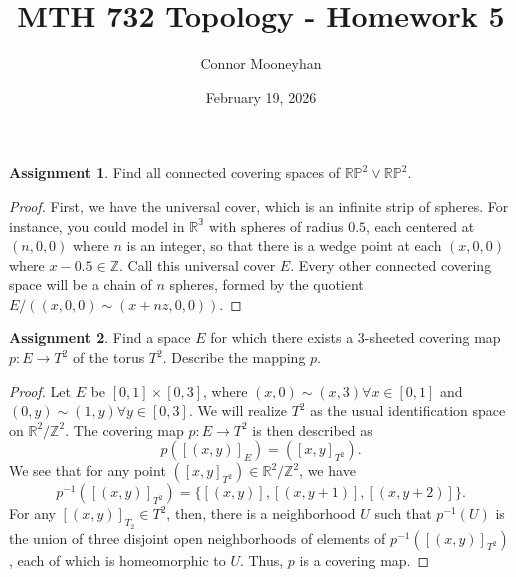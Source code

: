 \documentclass[12pt]{article}
\title{MTH 732 Topology - Homework 5}
\author{Connor Mooneyhan}
\date{February 19, 2026}
\theoremstyle{definition}
\newtheorem{ex}{Assignment}
\begin{document}
\maketitle

\begin{ex}
	Find all connected covering spaces of $\mathbb{RP}^2 \vee \mathbb{RP}^2$.
\end{ex}
\begin{proof}
	First, we have the universal cover, which is an infinite strip of spheres.
  For instance, you could model in $\mathbb{R^3}$ with spheres of radius $0.5$, each centered at $(n, 0, 0)$ where $n$ is an integer, so that there is a wedge point at each $(x, 0, 0)$ where $x - 0.5 \in \mathbb{Z}$.
  Call this universal cover $E$.
  Every other connected covering space will be a chain of $n$ spheres, formed by the quotient $E/((x, 0, 0) \sim (x + nz, 0, 0))$.
\end{proof}

\begin{ex}
	Find a space $E$ for which there exists a 3-sheeted covering map $p: E \to T^2$ of the torus $T^2$.
	Describe the mapping $p$.
\end{ex}
\begin{proof}
	Let $E$ be $[0, 1] \times [0, 3]$, where $(x, 0) \sim (x, 3) \forall x \in [0, 1]$ and $(0, y) \sim (1, y) \forall y \in [0, 3]$.
	We will realize $T^2$ as the usual identification space on $\mathbb{R}^2/\mathbb{Z}^2$.
	The covering map $p : E \to T^2$ is then described as \begin{equation*}
		p([(x, y)]_E) = ([x, y]_{T^2}).
	\end{equation*}
	We see that for any point $([x, y]_{T^2}) \in \mathbb{R}^2/\mathbb{Z}^2$, we have \begin{equation*}
		p^{-1}([(x, y)]_{T^2}) = \lbrace[(x, y)], [(x, y + 1)], [(x, y + 2)]\rbrace.
	\end{equation*}
	For any $[(x, y)]_{T_2} \in T^2$, then, there is a neighborhood $U$ such that $p^{-1}(U)$ is the union of three disjoint open neighborhoods of elements of $p^{-1}([(x, y)]_{T^2})$, each of which is homeomorphic to $U$.
	Thus, $p$ is a covering map.
\end{proof}
\end{document}
